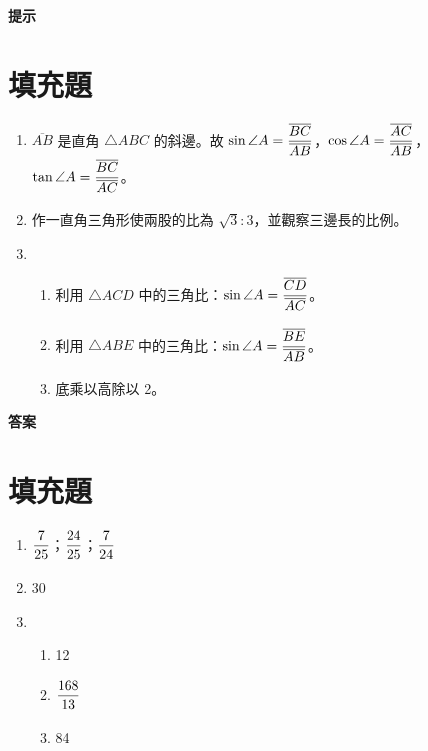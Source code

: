 \documentclass[10pt]{article}
\newcommand*{\fraction}[2]{\rule[-.8\baselineskip]{0pt}{2\baselineskip}\dfrac{#1}{#2}}
\begin{document}
\newpage
\label{hint}
{\bfseries\large 提示 \par}
\setcounter{section}{0}
\section{填充題}
\begin{enumerate}[label=\Alph*.,left=0pt]
  \item $\overline{AB}$ 是直角 $\triangle ABC$ 的斜邊。故 $\sin \angle A = \fraction{\overline{BC}}{\overline{AB}}$，$\cos \angle A = \fraction{\overline{AC}}{\overline{AB}}$，$\tan \angle A = \fraction{\overline{BC}}{\overline{AC}}$。
  \item 作一直角三角形使兩股的比為 $\sqrt{3}:3$，並觀察三邊長的比例。
  \item
  \begin{enumerate}[label=(\arabic*),left=0pt]
    \item 利用 $\triangle ACD$ 中的三角比：$\sin \angle A = \fraction{\overline{CD}}{\overline{AC}}$。
    \item 利用 $\triangle ABE$ 中的三角比：$\sin \angle A = \fraction{\overline{BE}}{\overline{AB}}$。
    \item 底乘以高除以 2。
  \end{enumerate}
\end{enumerate}

\newpage
\label{answer}
{\bfseries\large 答案 \par}
\setcounter{section}{0}
\section{填充題}
\begin{enumerate}[label=\Alph*.,left=0pt]
  \item $\fraction{7}{25}$；$\fraction{24}{25}$；$\fraction{7}{24}$
  \item 30
  \item
  \begin{enumerate}[label=(\arabic*),left=0pt]
    \item 12
    \item $\fraction{168}{13}$
    \item 84
  \end{enumerate}
\end{enumerate}
\end{document}
